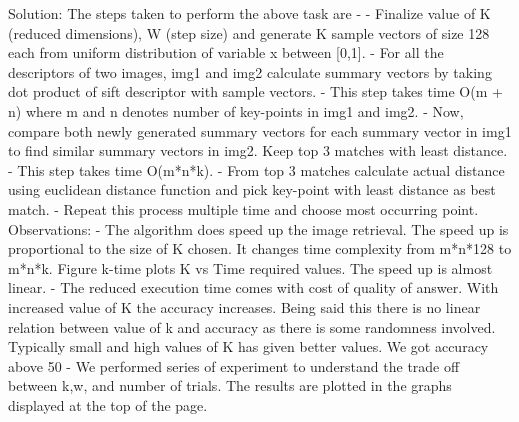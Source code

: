 \documentclass{article}
\begin{document}
\begin{enumerate}
		Solution: The steps taken to perform the above task are - \newline
		- Finalize value of K (reduced dimensions), W (step size) and generate K sample vectors of size 128 each from uniform distribution of variable x between [0,1].\newline
		- For all the descriptors of two images, img1 and img2 calculate summary vectors by taking dot product of sift descriptor with sample vectors.\newline
		- This step takes time O(m + n) where m and n denotes number of key-points in img1 and img2.\newline
		- Now, compare both newly generated summary vectors for each summary vector in img1 to find similar summary vectors in img2. Keep top 3 matches with least distance.\newline
		- This step takes time O(m*n*k).\newline
		- From top 3 matches calculate actual distance using euclidean distance function and pick key-point with least distance as best match.\newline
		- Repeat this process multiple time and choose most occurring point.\newline
		Observations:\newline
		- The algorithm does speed up the image retrieval. The speed up is proportional to the size of K chosen. It changes time complexity from m*n*128 to m*n*k. Figure k-time plots K vs Time required values. The speed up is almost linear.\newline
		- The reduced execution time comes with cost of quality of answer. With increased value of K the accuracy increases. Being said this there is no linear relation between value of k and accuracy as there is some randomness involved. Typically small and high values of K has given better values. We got accuracy above 50%
		- We performed series of experiment to understand the trade off between k,w, and number of trials. The results are plotted in the graphs displayed at the top of the page. \newline \newline
	\begin{figure}

\end{figure}
\end{enumerate}
\end{document}
